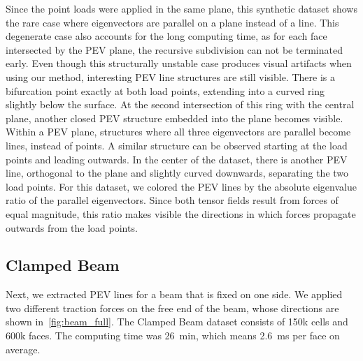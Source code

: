 %
Since the point loads were applied in the same plane, this synthetic dataset
shows the rare case where eigenvectors are parallel on a plane instead of a
line.
%
This degenerate case also accounts for the long computing time, as for each face
intersected by the \ac{PEV} plane, the recursive subdivision can not be terminated
early.
%
Even though this structurally unstable case produces visual artifacts when
using our method, interesting \ac{PEV} line structures are still visible.
%
There is a bifurcation point exactly at both load points, extending into a
curved ring slightly below the surface.
%
At the second intersection of this ring with the central plane, another closed
\ac{PEV} structure embedded into the plane becomes visible.
%
Within a \ac{PEV} plane, structures where all three eigenvectors are parallel become
lines, instead of points.
%
A similar structure can be observed starting at the load points and leading
outwards.
%
In the center of the dataset, there is another \ac{PEV} line, orthogonal to the
plane and slightly curved downwards, separating the two load points.
%
For this dataset, we colored the \ac{PEV} lines by the absolute eigenvalue ratio of
the parallel eigenvectors.
%
Since both tensor fields result from forces of equal magnitude, this ratio makes
visible the directions in which forces propagate outwards from the load points.
%
%
\subsection*{Clamped Beam} %
\label{ssub:clamped_beam}
%
%
%
%
%
Next, we extracted \ac{PEV} lines for a beam that is fixed on one side.
%
We applied two different traction forces on the free end of the beam, whose
directions are shown in~\autoref{fig:beam_full}.
%
The Clamped Beam dataset consists of 150k cells and 600k faces.
%
The computing time was \SI{26}{\minute}, which means \SI{2.6}{\milli\second}
per face on average.
%

%
%

